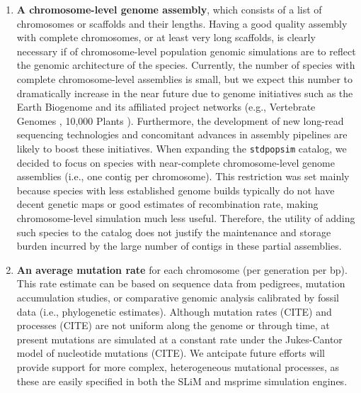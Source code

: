 \documentclass[hidelinks]{article}
\newcommand{\stdpopsim}{\texttt{stdpopsim}\xspace}
\begin{document}
\begin{enumerate}
\def\labelenumi{\arabic{enumi}.}

\item
  \textbf{A chromosome-level genome assembly}, which consists of a list of chromosomes or scaffolds and their lengths. 
  Having a good quality assembly with complete chromosomes, or at least very long scaffolds, 
  is clearly necessary if of chromosome-level population genomic simulations are to reflect the genomic architecture of the species.
  Currently, the number of species with complete chromosome-level assemblies is small,
  but we expect this number to dramatically increase in the near future due to genome initiatives 
  such as the Earth Biogenome \citep{Lewin2022} and its affiliated project networks (e.g.,
  Vertebrate Genomes \citep{Rhie2021}, 10,000 Plants \citep{Cheng2018}).
  Furthermore, the development of new long-read sequencing technologies
  \citep{Amarasinghe2020} and concomitant advances in assembly pipelines
  \citep{Chakraborty2016} are likely to boost these initiatives. 
  When expanding the \stdpopsim catalog, we decided to focus on species with near-complete 
  chromosome-level genome assemblies (i.e., one contig per chromosome).
  This restriction was set mainly because species with less established genome builds 
  typically do not have decent genetic maps or good estimates of recombination rate, 
  making chromosome-level simulation much less useful. 
  Therefore, the utility of adding such species to the catalog does not justify the 
  maintenance and storage burden incurred by the large number of contigs in these partial assemblies.

\item
  \textbf{An average mutation rate} for each chromosome (per generation per bp).
  This rate estimate can be based on sequence data from pedigrees, mutation accumulation studies, 
  or comparative genomic analysis calibrated by fossil data (i.e., phylogenetic estimates).
  Although mutation rates (CITE) and processes (CITE) are not uniform along the genome or through time,
  at present mutations are simulated at a constant rate under the Jukes-Cantor model of nucleotide mutations (CITE).
  We antcipate future efforts will provide support for more complex, heterogeneous mutational processes,
  as these are easily specified in both the SLiM and msprime simulation engines.


\end{enumerate}
\end{document}
